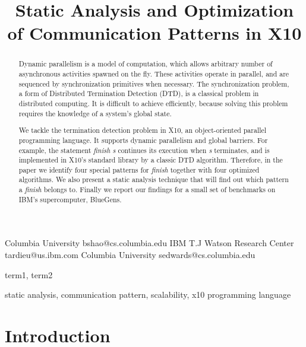 \documentclass[preprint]{sigplanconf}
\begin{document}
\copyrightdata{[to be supplied]} 


\title{Static Analysis and Optimization of Communication Patterns in X10}

           {Columbia University}
           {bshao@cs.columbia.edu}
           {IBM T.J Watson Research Center}
           {tardieu@us.ibm.com}
           {Columbia University}
           {sedwards@cs.columbia.edu}
\
\maketitle

\begin{abstract}
Dynamic parallelism is a model of computation, which allows arbitrary number of 
asynchronous activities spawned on the fly. These activities operate in parallel, 
and are sequenced by synchronization primitives when necessary. 
The synchronization problem, a form of Distributed Termination Detection (DTD), 
is a classical problem in distributed computing. It is difficult to achieve efficiently, 
because solving this problem requires the knowledge of a system's global state. 

We tackle the termination detection problem in X10, an object-oriented 
parallel programming language. It supports dynamic parallelism and global 
barriers. For example, the statement \emph{finish s} continues its execution 
when \emph{s} terminates, and is implemented in X10's standard library 
by a classic DTD algorithm. 
Therefore, in the paper we identify four special patterns for \emph{finish} 
together with four optimized algorithms. 
We also present a static analysis technique that will find out which pattern 
a \emph{finish} belongs to. Finally we report our findings for a small
set of benchmarks on IBM's supercomputer, BlueGens. 

\end{abstract}


\terms
term1, term2

\keywords
static analysis, communication pattern, scalability, x10 programming language
\section{Introduction}
\end{document}
